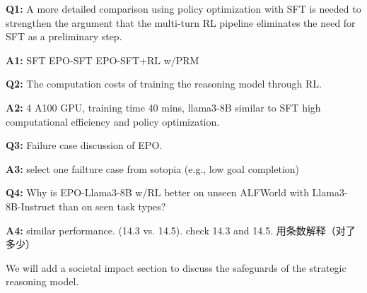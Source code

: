 \textbf{Q1:} A more detailed comparison using policy optimization with SFT is needed to strengthen the argument that the multi-turn RL pipeline eliminates the need for SFT as a preliminary step.

\textbf{A1:}
SFT
EPO-SFT
EPO-SFT+RL w/PRM


\textbf{Q2:} The computation costs of training the reasoning model through RL.

\textbf{A2:}
4 A100 GPU, training time 40 mins, llama3-8B
similar to SFT
high computational efficiency and policy optimization. 




\textbf{Q3:} Failure case discussion of EPO.

\textbf{A3:}
select one failture case from sotopia (e.g., low goal completion)


\textbf{Q4:} Why is EPO-Llama3-8B w/RL better on unseen ALFWorld with Llama3-8B-Instruct than on seen task types?

\textbf{A4:} 
similar performance. (14.3 vs. 14.5). check 14.3 and 14.5. 用条数解释（对了多少）


We will add a societal impact section to discuss the safeguards of the strategic reasoning model.


